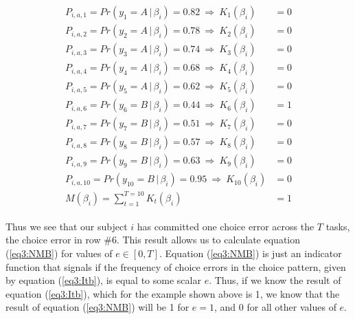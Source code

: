 \documentclass[../main.tex]{subfiles}
\begin{document}
\begin{align}
	\label{eq3:example_MTBn}
	\begin{split}
		P_{i,a,1}  = Pr(y_1 = A    \,|\, \beta_i) = 0.82 ~ \Rightarrow ~ K_{1}(\beta_i)  &= 0 \\
		P_{i,a,2}  = Pr(y_2 = A    \,|\, \beta_i) = 0.78 ~ \Rightarrow ~ K_{2}(\beta_i)  &= 0 \\
		P_{i,a,3}  = Pr(y_3 = A    \,|\, \beta_i) = 0.74 ~ \Rightarrow ~ K_{3}(\beta_i)  &= 0 \\
		P_{i,a,4}  = Pr(y_4 = A    \,|\, \beta_i) = 0.68 ~ \Rightarrow ~ K_{4}(\beta_i)  &= 0 \\
		P_{i,a,5}  = Pr(y_5 = A    \,|\, \beta_i) = 0.62 ~ \Rightarrow ~ K_{5}(\beta_i)  &= 0 \\
		P_{i,a,6}  = Pr(y_6 = B    \,|\, \beta_i) = 0.44 ~ \Rightarrow ~ K_{6}(\beta_i)  &= 1 \\
		P_{i,a,7}  = Pr(y_7 = B    \,|\, \beta_i) = 0.51 ~ \Rightarrow ~ K_{7}(\beta_i)  &= 0 \\
		P_{i,a,8}  = Pr(y_8 = B    \,|\, \beta_i) = 0.57 ~ \Rightarrow ~ K_{8}(\beta_i)  &= 0 \\
		P_{i,a,9}  = Pr(y_9 = B    \,|\, \beta_i) = 0.63 ~ \Rightarrow ~ K_{9}(\beta_i)  &= 0 \\
		P_{i,a,10} = Pr(y_{10} = B \,|\, \beta_i) = 0.95 ~ \Rightarrow ~ K_{10}(\beta_i) &= 0 \\
		                                M(\beta_i) = \sum_{t = 1}^{T = 10}{K_t(\beta_i)} &= 1
	\end{split}
\end{align}

\noindent Thus we see that our subject $i$ has committed one choice error across the $T$ tasks, the choice error in row \#6.
This result allows us to calculate equation (\ref{eq3:NMB}) for values of $e \in [ 0, T ]$.
Equation (\ref{eq3:NMB}) is just an indicator function that signals if the frequency of choice errors in the choice pattern, given by equation (\ref{eq3:Itb}), is equal to some scalar $e$.
Thus, if we know the result of equation (\ref{eq3:Itb}), which for the example shown above is 1, we know that the result of equation (\ref{eq3:NMB}) will be 1 for $e = 1$, and 0 for all other values of $e$.
\end{document}
